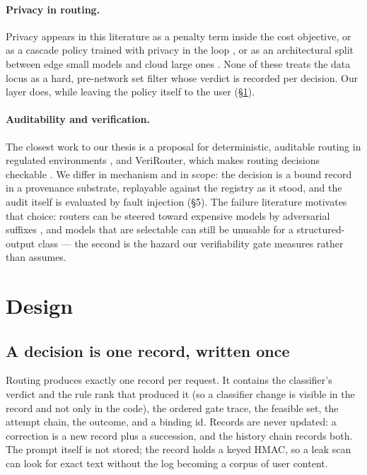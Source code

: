 \documentclass[11pt]{article}
\begin{document}
\paragraph{Privacy in routing.} Privacy appears in this literature as a penalty term inside the
cost objective, or as a cascade policy trained with privacy in the loop
\cite{privcascade}, or as an architectural split between edge small models and cloud large ones
\cite{edgesurvey}. None of these treats the data locus as a hard, pre-network set filter whose
verdict is recorded per decision. Our layer does, while leaving the policy itself to the user
(§\ref{sec:design}).

\paragraph{Auditability and verification.} The closest work to our thesis is a proposal for
deterministic, auditable routing in regulated environments \cite{auditroute}, and VeriRouter,
which makes routing decisions checkable \cite{verifier}. We differ in mechanism and in scope: the
decision is a bound record in a provenance substrate, replayable against the registry as it stood,
and the audit itself is evaluated by fault injection (§5). The failure literature motivates that
choice: routers can be steered toward expensive models by adversarial suffixes \cite{rome}, and
models that are selectable can still be unusable for a structured-output class
\cite{structout} --- the second is the hazard our verifiability gate measures rather than assumes.


\section{Design}\label{sec:design}

\subsection{A decision is one record, written once}

Routing produces exactly one record per request. It contains the classifier's verdict and the
rule rank that produced it (so a classifier change is visible in the record and not only in the
code), the ordered gate trace, the feasible set, the attempt chain, the outcome, and a binding
id. Records are never updated: a correction is a new record plus a succession, and the history
chain records both. The prompt itself is not stored; the record holds a keyed HMAC, so a leak
scan can look for exact text without the log becoming a corpus of user content.
\end{document}
